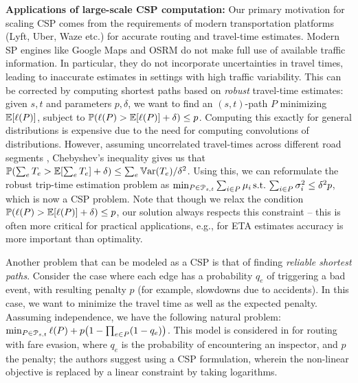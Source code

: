 \noindent\textbf{Applications of large-scale CSP computation:}
Our primary motivation for scaling CSP comes from the requirements of modern transportation platforms (Lyft, Uber, Waze etc.) for accurate routing and travel-time estimates.
Modern SP engines like Google Maps and OSRM do not make full use of available traffic information.
In particular, they do not incorporate uncertainties in travel times, leading to inaccurate estimates in settings with high traffic variability.
This can be corrected by computing shortest paths based on \emph{robust} travel-time estimates:
given $s,t$ and parameters $p,\delta$, we want to find an $(s,t)$-path $P$ minimizing $\mathbb{E}[\ell(P)]$, subject to $\mathbb{P}(\ell(P)>\mathbb{E}[\ell(P)]+\delta)\leq p$.
Computing this exactly for general distributions is expensive due to the need for computing convolutions of distributions. 
However, assuming uncorrelated travel-times across different road segments , Chebyshev's inequality gives us that $\mathbb{P}(\sum_eT_e>\mathbb{E}[\sum_eT_e]+\delta)\leq \sum_e\mathbb{V}\textnormal{ar}(T_e)/\delta^2$. Using this, we can reformulate the robust trip-time estimation problem as 
$\min_{ P\in\mathcal{P}_{s,t}}\sum_{i\in P}\mu_i \, \mbox{s.t.}\, \sum_{i\in P}\sigma^2_i\leq \delta^2p$, which is now a CSP problem. 
Note that though we relax the condition $\mathbb{P}(\ell(P)>\mathbb{E}[\ell(P)]+\delta)\leq p$, our solution always respects this constraint -- this is often more critical for practical applications, e.g., for ETA estimates accuracy is more important than optimality.

Another problem that can be modeled as a CSP is that of finding \emph{reliable shortest paths}.
Consider the case where each edge has a probability $q_e$ of triggering a bad event, with resulting penalty $p$ (for example, slowdowns due to accidents).
In this case, we want to minimize the travel time as well as the expected penalty.
Aassuming independence, we have the following natural problem:
$\min_{P\in\Pst} \ell(P)+p\prn*{1-\prod_{e\in P}(1-q_e)}$.
This model is considered in \cite{fareevasion} for routing with fare evasion, where $q_e$ is the probability of encountering an inspector, and $p$ the penalty; the authors suggest using a CSP formulation, wherein the non-linear objective is replaced by a linear constraint by taking logarithms.


